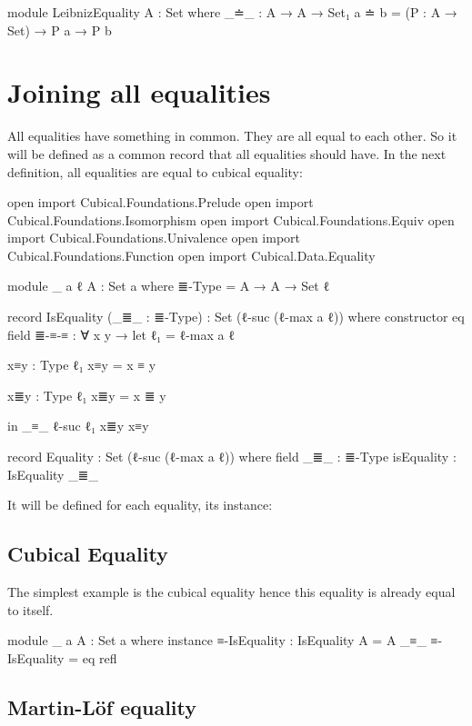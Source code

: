 \documentclass{article}
\begin{document}
\begin{code}
module LeibnizEquality {A : Set} where
  _≐_ : A → A → Set₁
  a ≐ b = (P : A → Set) → P a → P b
\end{code}

\section{Joining all equalities}

All equalities have something in common. They are all equal to each other.
So it will be defined as a common record that all equalities should have.
In the next definition, all equalities are equal to cubical equality:

\begin{code}

open import Cubical.Foundations.Prelude
open import Cubical.Foundations.Isomorphism
open import Cubical.Foundations.Equiv
open import Cubical.Foundations.Univalence
open import Cubical.Foundations.Function
open import Cubical.Data.Equality

module _ {a ℓ} {A : Set a} where
  ≣-Type = A → A → Set ℓ

  record IsEquality (_≣_ : ≣-Type) : Set (ℓ-suc (ℓ-max a ℓ)) where
    constructor eq
    field
      ≣-≡-≡ : ∀ {x y} → let
        ℓ₁ = ℓ-max a ℓ

        x≡y : Type ℓ₁
        x≡y = x ≡ y

        x≣y : Type ℓ₁
        x≣y = x ≣ y

        in _≡_ {ℓ-suc ℓ₁} x≣y x≡y

  record Equality : Set (ℓ-suc (ℓ-max a ℓ)) where
    field
      _≣_ : ≣-Type
      isEquality : IsEquality _≣_
\end{code}

It will be defined for each equality, its instance:

\subsection{Cubical Equality}

The simplest example is the cubical equality hence this equality is already equal to itself.

\begin{code}
module _ {a} {A : Set a} where
  instance
    ≡-IsEquality : IsEquality {A = A} _≡_
    ≡-IsEquality = eq refl
\end{code}

\subsection{Martin-Löf equality}
\end{document}
